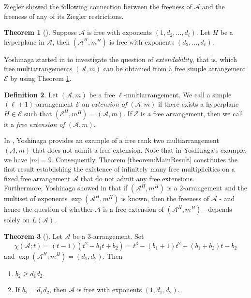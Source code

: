 \documentclass[12pt]{amsart}
\theoremstyle{definition}
\newtheorem{theorem}{Theorem}[section]
\newtheorem{definition}[theorem]{Definition}
\theoremstyle{remark}
\newcommand\CA{{\mathscr A}}
\newcommand\CE{{\mathscr E}}
\begin{document}
Ziegler showed the following connection between the freeness of $\CA$ and the freeness of any of its Ziegler restrictions.

\begin{theorem}[{\cite[Thm.~11]{MR1000610}}]\label{theorem: ziegler restriction}
	Suppose $\CA$ is free with exponents $(1,d_2,\dots,d_\ell)$. Let $H$ be a hyperplane in $\CA$, then $(\CA^H,m^H)$ is free with exponents $(d_2,\dots,d_\ell)$. 
\end{theorem}

Yoshinaga started in \cite{MR3025868} to investigate the question of \emph{extendability}, that is, which free multiarrangements $(\CA,m)$ can be obtained from a free simple arrangement $\CE$ by using Theorem \ref{theorem: ziegler restriction}.

\begin{definition}
Let $(\CA,m)$ be a free $\ell$-multiarrangement. We call a simple $(\ell+1)$-arrangement $\CE$ an \emph{extension of $(\CA,m)$} if there exists a hyperplane $H\in \CE$ such that $(\CE^H,m^H)=(\CA,m)$. If $\CE$ is a free arrangement, then we call it a \emph{free extension of $(\CA,m)$}.
\end{definition} 

In \cite[Ex.~1.4]{MR3025868}, Yoshinaga provides an example of a free rank two multiarrangement $(\CA,m)$ that does not admit a free extension. Note that in Yoshinaga's example, we have $\vert m\vert= 9$. Consequently, Theorem \ref{theorem:MainResult} constitutes the first result establishing the existence of infinitely many free multiplicities on a fixed free arrangement $\CA$ that do not admit any free extensions.\\
Furthermore, Yoshinaga showed in \cite{MR2105827} that if $(\CA^H, m^H)$ is a $2$-arrangement and the multiset of exponents $\exp(\CA^H, m^H)$ is known, then the freeness of $\CA$ - and hence the question of whether $\CA$ is a free extension of $(\CA^H, m^H)$ - depends solely on $L(\CA)$.
  
\begin{theorem}[{\cite[Cor.~3.3]{MR2105827}}]\label{theorem: Yoshinaga ChaPol}
    Let $\CA$ be a $3$-arrangement. Set $$\chi(\CA;t)=(t-1)(t^2-b_1t+b_2)=t^3-(b_1+1) t^2 + (b_1+b_2) t  - b_2$$ and $\exp(\CA^{H},m^H)=(d_1,d_2)$. Then
    \begin{enumerate}
        \item $b_2\geq d_1 d_2$.
        \item If $b_2=d_1d_2$, then $\CA$ is free with exponents $(1,d_1,d_2)$.
    \end{enumerate}
\end{theorem}
\end{document}
